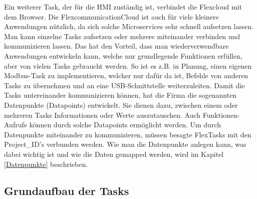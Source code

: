 Ein weiterer Task, der für die HMI zuständig ist, verbindet die Flexcloud mit dem Browser. Die FlexcommunicationCloud ist auch für viele kleinere Anwendungen nützlich, da sich solche Microservices sehr schnell aufsetzen lassen. Man kann einzelne Tasks aufsetzen oder mehrere miteinander verbinden und kommunizieren lassen. Das hat den Vorteil, dass man wiederverwendbare Anwendungen entwickeln kann, welche nur grundlegende Funktionen erfüllen, aber von vielen Tasks gebraucht werden. So ist es z.B. in Planung, einen eigenen Modbus-Task zu implementieren, welcher nur dafür da ist, Befehle von anderen Tasks zu übernehmen und an eine USB-Schnittstelle weiterzuleiten.
Damit die Tasks untereinander kommunizieren können, hat die Firma die sogenannten Datenpunkte (Datapoints) entwickelt. Sie dienen dazu, zwischen einem oder mehreren Tasks Informationen oder Werte auszutauschen. Auch Funktionen-Aufrufe können durch solche Datapoints ermöglicht werden. Um durch Datenpunkte miteinander zu kommunizieren, müssen besagte FlexTasks mit den Project\_ID's verbunden werden.
Wie man die Datenpunkte anlegen kann, was dabei wichtig ist und wie die Daten gemapped werden, wird im Kapitel \ref{Datenpunkte} beschrieben.
\subsection{Grundaufbau der Tasks}

